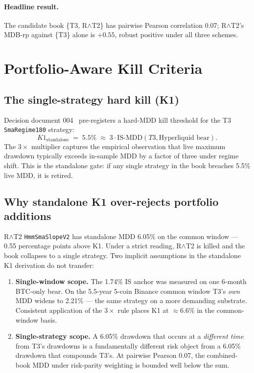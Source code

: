 \documentclass[11pt]{article}
\begin{document}
\paragraph{Headline result.} The candidate book \{T3, R$\wedge$T2\} has
pairwise Pearson correlation 0.07; R$\wedge$T2's MDB-rp against
\{T3\} alone is $+0.55$, robust positive under all three schemes.

\section{Portfolio-Aware Kill Criteria}
\label{sec:portfolio-k1}

\subsection{The single-strategy hard kill (K1)}
\label{sec:k1-standalone}

Decision document 004~\citep{decision_004} pre-registers a hard-MDD kill
threshold for the T3 \texttt{SmaRegime180} strategy:
\begin{equation}
K1_{\mathrm{standalone}} \;=\; 5.5\% \;\approx\; 3 \cdot \mathrm{IS\text{-}MDD}(T3, \text{Hyperliquid bear}).
\end{equation}
The $3\times$ multiplier captures the empirical observation that live
maximum drawdown typically exceeds in-sample MDD by a factor of three under
regime shift. This is the standalone gate: if any single strategy in the
book breaches 5.5\% live MDD, it is retired.

\subsection{Why standalone K1 over-rejects portfolio additions}

R$\wedge$T2 \texttt{HmmSmaSlopeV2} has standalone MDD 6.05\% on the common
window --- 0.55 percentage points above K1. Under a strict reading,
R$\wedge$T2 is killed and the book collapses to a single strategy. Two
implicit assumptions in the standalone K1 derivation do not transfer:

\begin{enumerate}
  \item \textbf{Single-window scope.} The 1.74\% IS anchor was measured on
        one 6-month BTC-only bear. On the 5.5-year 5-coin Binance common
        window T3's \emph{own} MDD widens to 2.21\% --- the same strategy on
        a more demanding substrate. Consistent application of the $3\times$
        rule places K1 at $\approx 6.6\%$ in the common-window basis.
  \item \textbf{Single-strategy scope.} A 6.05\% drawdown that occurs at a
        \emph{different time} from T3's drawdowns is a fundamentally
        different risk object from a 6.05\% drawdown that compounds T3's. At
        pairwise Pearson 0.07, the combined-book MDD under risk-parity
        weighting is bounded well below the sum.
\end{enumerate}
\end{document}
